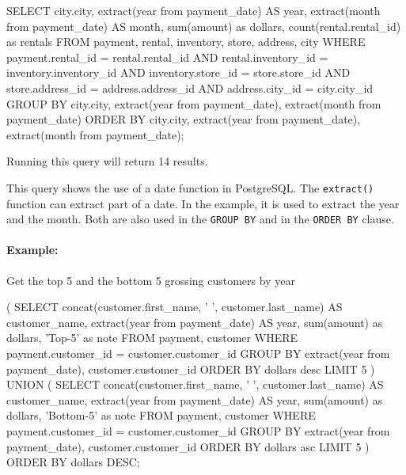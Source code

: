 \begin{samepage}
\begin{sqlcode}
SELECT city.city, 
       extract(year from payment_date) AS year, 
       extract(month from payment_date) AS month, 
       sum(amount) as dollars, 
       count(rental.rental_id) as rentals
FROM payment, rental, inventory, store, address, city
WHERE payment.rental_id = rental.rental_id AND
      rental.inventory_id = inventory.inventory_id AND
      inventory.store_id = store.store_id AND
      store.address_id = address.address_id AND
      address.city_id = city.city_id
GROUP BY city.city, 
         extract(year from payment_date), 
         extract(month from payment_date)
ORDER BY city.city, 
         extract(year from payment_date), 
         extract(month from payment_date);
\end{sqlcode}
\end{samepage}

Running this query will return 14 results.

This query shows the use of a date function in PostgreSQL. The \texttt{extract()} function can extract part of a date. In the example, it is used to extract the year and the month. Both are also used in the \texttt{GROUP BY} and in the \texttt{ORDER BY} clause. 

\paragraph*{Example:} Get the top 5 and the bottom 5 grossing customers by year


\begin{samepage}
\begin{sqlcode}
( SELECT concat(customer.first_name, ' ', 
                customer.last_name) AS customer_name,
       extract(year from payment_date) AS year, 
       sum(amount) as dollars,
       'Top-5' as note
FROM payment, customer
WHERE payment.customer_id = customer.customer_id
GROUP BY extract(year from payment_date),
         customer.customer_id
ORDER BY dollars desc
LIMIT 5
) UNION (
SELECT concat(customer.first_name, ' ', 
              customer.last_name) AS customer_name,
       extract(year from payment_date) AS year, 
       sum(amount) as dollars,
       'Bottom-5' as note
FROM payment, customer
WHERE payment.customer_id = customer.customer_id
GROUP BY extract(year from payment_date),
         customer.customer_id
ORDER BY dollars asc
LIMIT 5 ) ORDER BY dollars DESC;
\end{sqlcode}
\end{samepage}

